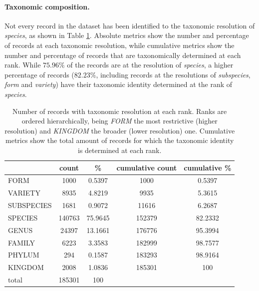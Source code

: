 \paragraph*{Taxonomic composition.}
% 
Not every record in the dataset has been identified to the taxonomic resolution of \textit{species}, as shown in Table \ref{table:dset_taxonomicres_counts}. 
Absolute metrics show the number and percentage of records at each taxonomic resolution, while cumulative metrics show the number and percentage of records that are taxonomically determined at each rank.
While $75.96\%$ of the records are at the resolution of \textit{species}, a higher percentage of records ($82.23\%$, including records at the resolutions of \textit{subspecies}, \textit{form} and \textit{variety}) have their taxonomic identity determined at the rank of \textit{species}.

\begin{table}[H]
  \caption{Number of records with taxonomic resolution at each rank. Ranks are ordered hierarchically, being \textit{FORM} the most restrictive (higher resolution) and \textit{KINGDOM} the broader (lower resolution) one. Cumulative metrics show the total amount of records for which the taxonomic identity is determined at each rank.}
  \begin{center}
  \begin{tabular}{l c c c c}
       & count & \% & cumulative count & cumulative \% \\
      \hline
      FORM & 1000 & 0.5397 & 1000 & 0.5397\\
      VARIETY & 8935 & 4.8219 & 9935 & 5.3615\\
      SUBSPECIES & 1681 & 0.9072 & 11616 & 6.2687\\
      SPECIES & 140763 & 75.9645 & 152379 & 82.2332\\
      GENUS & 24397 & 13.1661 & 176776 & 95.3994\\
      FAMILY & 6223 & 3.3583 & 182999 & 98.7577\\
      PHYLUM & 294 & 0.1587 & 183293 & 98.9164\\
      KINGDOM & 2008 & 1.0836 & 185301 & 100\\
      \hline
      total & 185301 & 100 & &
  \end{tabular}
  \end{center}
  \label{table:dset_taxonomicres_counts}
\end{table}





